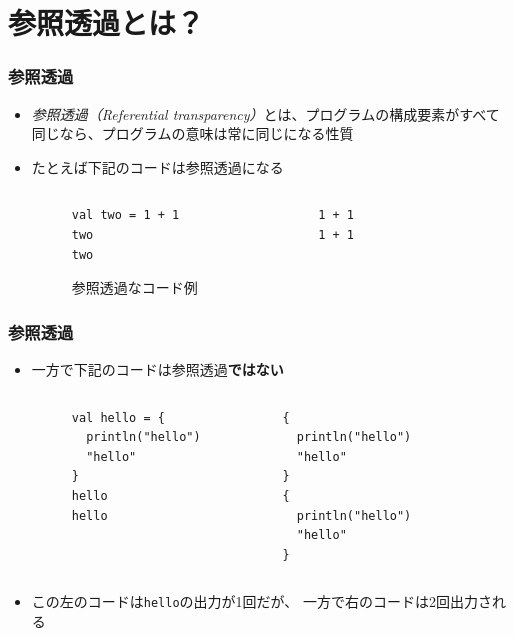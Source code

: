 \section{参照透過とは？}

\begin{frame}[fragile]
  \frametitle{参照透過}

  \begin{itemize}
    \item<+-> \emph{参照透過（Referential transparency）}とは、プログラムの構成要素がすべて同じなら、プログラムの意味は常に同じになる性質

    \item<+-> たとえば下記のコードは参照透過になる
    \begin{figure}[h]
      \begin{columns}
        \begin{column}{0.4\textwidth}
\begin{lstlisting}[style=scala]
val two = 1 + 1
two
two
\end{lstlisting}
      \end{column}
      \begin{column}{0.4\textwidth}
\begin{lstlisting}[style=scala]
1 + 1
1 + 1
\end{lstlisting}
        \end{column}
      \end{columns}
      \label{fig:lst_referential_transparency}
      \caption{参照透過なコード例}
    \end{figure}

  \end{itemize}
\end{frame}

\begin{frame}[fragile]
  \frametitle{参照透過}

  \begin{itemize}
    \item<+-> 一方で下記のコードは参照透過\textbf{ではない}
    \begin{figure}[h]
      \begin{columns}
        \begin{column}{0.4\textwidth}
\begin{lstlisting}[style=scala]
val hello = {
  println("hello")
  "hello"
}
hello
hello
\end{lstlisting}
        \end{column}
        \begin{column}{0.4\textwidth}
\begin{lstlisting}[style=scala]
{
  println("hello")
  "hello"
}
{
  println("hello")
  "hello"
}
\end{lstlisting}
        \end{column}
      \end{columns}
    \end{figure}

    \item<+-> この左のコードは\lstinline|hello|の出力が1回だが、
    一方で右のコードは2回出力される
  \end{itemize}
\end{frame}

